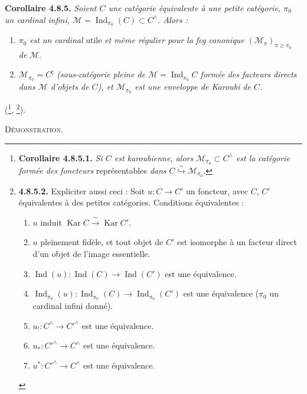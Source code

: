 \documentclass[11pt]{article}
\newcommand{\printedpage}[1]{\marginpar{\footnotesize p.~#1}}
\newcommand{\msp}[1]{\marginpar{\footnotesize [#1]}}
\newcommand{\Ind}{\operatorname{Ind}}
\newcommand{\Kar}{\operatorname{Kar}}
\begin{document}
\msp{page 201}
\textbf{Corollaire 4.8.5.} \textit{Soient $C$ une catégorie équivalente à une petite catégorie, $\pi_0$ un cardinal infini, $\mathcal{M}=\Ind_{\pi_0}(C)\subset C^\wedge$. Alors :}
\begin{enumerate}
\item[\textit{1$^\circ$)}] $\pi_0$ \textit{est un cardinal} utile \textit{et même régulier pour la fcg canonique} $(\mathcal{M}_\pi)_{\pi\geqslant\pi_0}$ \textit{de} $\mathcal{M}$.
\item[\textit{2$^\circ$)}] $\mathcal{M}_{\pi_0}=C^\natural$ \textit{(sous-catégorie pleine de $\mathcal{M}=\Ind_{\pi_0}C$ formée des facteurs directs dans $\mathcal{M}$ d'objets de $C$), et $\mathcal{M}_{\pi_0}$ est une enveloppe de Karoubi de $C$.}
\end{enumerate}
(\footnote{\textbf{Corollaire 4.8.5.1.} \textit{Si $C$ est karoubienne, alors $\mathcal{M}_{\pi_0}\subset C^\wedge$ est la catégorie formée des foncteurs} représentables \textit{dans} $C\overset{\sim}{\hookrightarrow}\mathcal{M}_{\pi_0}$.}, \footnote{\textbf{4.8.5.2.} Expliciter aussi ceci : Soit $u : C\longrightarrow C'$ un foncteur, avec $C$, $C'$ équivalentes à des petites catégories. Conditions équivalentes :
\begin{enumerate}
\item[a)] $u$ induit $\Kar C\xrightarrow{\ \sim\ }\Kar C'$.
\item[a$'$)] $u$ pleinement fidèle, et tout objet de $C'$ est isomorphe à un facteur direct d'un objet de l'image essentielle.
\item[b)] $\Ind(u) : \Ind(C)\longrightarrow\Ind(C')$ est une équivalence.
\item[c)] $\Ind_{\pi_0}(u) : \Ind_{\pi_0}(C)\longrightarrow\Ind_{\pi_0}(C')$ est une équivalence ($\pi_0$ un cardinal infini donné).
\item[d)] $u_! : C^\wedge\longrightarrow C'^\wedge$ est une équivalence.
\item[d$'$)] $u_* : C'^\wedge\longrightarrow C^\wedge$ est une équivalence.
\item[d$''$)] $u^* : C'^\wedge\longrightarrow C^\wedge$ est une équivalence.
\end{enumerate}}).

\printedpage{71}

\textsc{Démonstration.}
\end{document}
